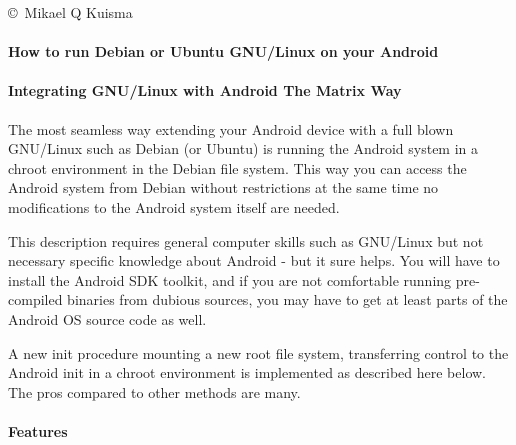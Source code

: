 
 \copyright\ Mikael Q Kuisma
\bigskip

\paragraph{How to run Debian or Ubuntu GNU/Linux on your Android}

\bigskip

\paragraph{Integrating GNU/Linux with Android The Matrix Way}

\bigskip

The most seamless way extending your Android device with a full blown GNU/Linux
such as Debian (or Ubuntu) is running the Android system in a chroot environment
in the Debian file system. This way you can access the Android system from
Debian without restrictions at the same time no modifications to the Android
system itself are needed.

This description requires general computer skills such as GNU/Linux but not
necessary specific knowledge about Android - but it sure helps. You will have to
install the Android SDK toolkit, and if you are not comfortable running
pre-compiled binaries from dubious sources, you may have to get at least parts
of the Android OS source code as well.

A new init procedure mounting a new root file system, transferring control to
the Android init in a chroot environment is implemented as described here below.
The pros compared to other methods are many.

\paragraph{Features}

